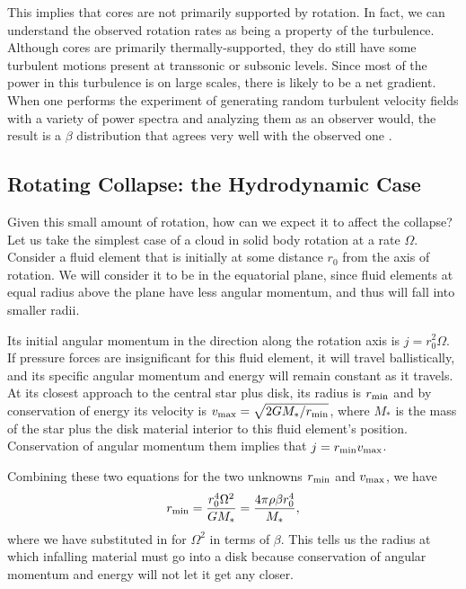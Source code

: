 This implies that cores are not primarily supported by rotation. In fact, we can understand the observed rotation rates as being a property of the turbulence. Although cores are primarily thermally-supported, they do still have some turbulent motions present at transsonic or subsonic levels. Since most of the power in this turbulence is on large scales, there is likely to be a net gradient. When one performs the experiment of generating random turbulent velocity fields with a variety of power spectra and analyzing them as an observer would, the result is a $\beta$ distribution that agrees very well with the observed one \citep{burkert00a}.

\subsection{Rotating Collapse: the Hydrodynamic Case}

Given this small amount of rotation, how can we expect it to affect the collapse? Let us take the simplest case of a cloud in solid body rotation at a rate $\Omega$. Consider a fluid element that is initially at some distance $r_0$ from the axis of rotation. We will consider it to be in the equatorial plane, since fluid elements at equal radius above the plane have less angular momentum, and thus will fall into smaller radii.

Its initial angular momentum in the direction along the rotation axis is $j=r_0^2\Omega$. If pressure forces are insignificant for this fluid element, it will travel ballistically, and its specific angular momentum and energy will remain constant as it travels. At its closest approach to the central star plus disk, its radius is $r_{\rm min}$ and by conservation of energy its velocity is $v_{\rm max} = \sqrt{2 G M_*/r_{\rm min}}$, where $M_*$ is the mass of the star plus the disk material interior to this fluid element's position.
Conservation of angular momentum them implies that $j=r_{\rm min} v_{\rm max}$.

Combining these two equations for the two unknowns $r_{\rm min}$ and $v_{\rm max}$, we have
\begin{equation}
r_{\rm min} = \frac{r_0^4 \Omega^2}{G M_*} = \frac{4\pi \rho \beta r_0^4}{M_*},
\end{equation}
where we have substituted in for $\Omega^2$ in terms of $\beta$. This tells us the radius at which infalling material must go into a disk because conservation of angular momentum and energy will not let it get any closer.

